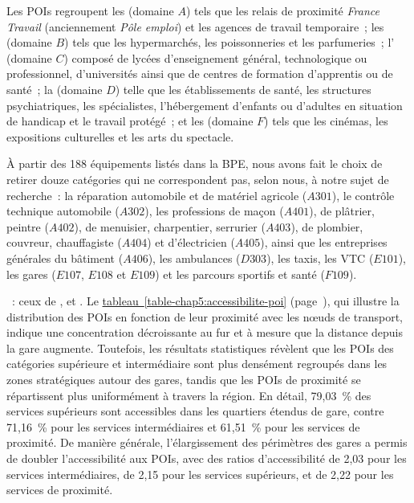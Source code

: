 \begin{refsegment}
{\begin{customitemize}
        \item Les \acrshort{POIs}  regroupent les  (domaine \(A\)) tels que les relais de proximité \textsl{France Travail} (anciennement \textsl{Pôle emploi}) et les agences de travail temporaire~; les  (domaine \(B\)) tels que les hypermarchés, les poissonneries et les parfumeries~; l' (domaine \(C\)) composé de lycées d'enseignement général, technologique ou professionnel, d'universités ainsi que de centres de formation d'apprentis ou de santé~; la  (domaine \(D\)) telle que les établissements de santé, les structures psychiatriques, les spécialistes, l'hébergement d'enfants ou d'adultes en situation de handicap et le travail protégé~; et les  (domaine \(F\)) tels que les cinémas, les expositions culturelles et les arts du spectacle.
    \end{customitemize}
À partir des 188 équipements listés dans la \acrfull{BPE}, nous avons fait le choix de retirer douze catégories qui ne correspondent pas, selon nous, à notre sujet de recherche~: la réparation automobile et de matériel agricole (\(A301\)), le contrôle technique automobile (\(A302\)), les professions de maçon (\(A401\)), de plâtrier, peintre (\(A402\)), de menuisier, charpentier, serrurier (\(A403\)), de plombier, couvreur, chauffagiste (\(A404\)) et d'électricien (\(A405\)), ainsi que les entreprises générales du bâtiment (\(A406\)), les ambulances (\(D303\)), les taxis, les \acrshort{VTC} (\(E101\)), les gares (\(E107\), \(E108\) et \(E109\)) et les parcours sportifs et santé (\(F109\)).
}~: ceux de ,  et . Le \hyperref[table-chap5:accessibilite-poi]{tableau~\ref{table-chap5:accessibilite-poi}} (page~\pageref{table-chap5:accessibilite-poi}), qui illustre la distribution des \acrshort{POIs} en fonction de leur proximité avec les nœuds de transport, indique une concentration décroissante au fur et à mesure que la distance depuis la gare augmente. Toutefois, les résultats statistiques révèlent que les \acrshort{POIs} des catégories supérieure et intermédiaire sont plus densément regroupés dans les zones stratégiques autour des gares, tandis que les \acrshort{POIs} de proximité se répartissent plus uniformément à travers la région. En détail, 79,03~\% des services supérieurs sont accessibles dans les quartiers étendus de gare, contre 71,16~\% pour les services intermédiaires et 61,51~\% pour les services de proximité. De manière générale, l'élargissement des périmètres des gares a permis de doubler l'accessibilité aux \acrshort{POIs}, avec des ratios d'accessibilité de 2,03 pour les services intermédiaires, de 2,15 pour les services supérieurs, et de 2,22 pour les services de proximité.%


\end{refsegment}
